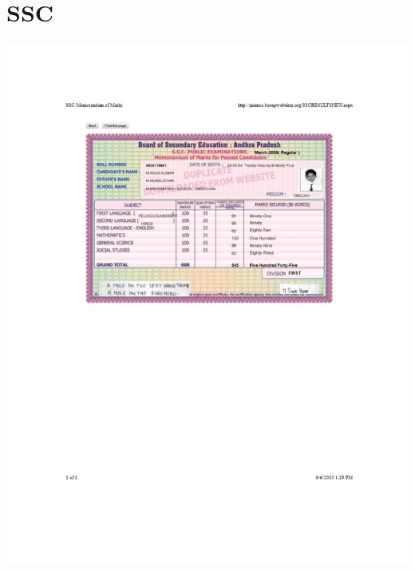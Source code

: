 \documentclass{article}
\begin{document}
\tableofcontents
\section{SSC}
	\includegraphics[page=1, scale=0.5]{proofs/ssc_memo_frm_website.pdf}
	\newpage
\end{document}
